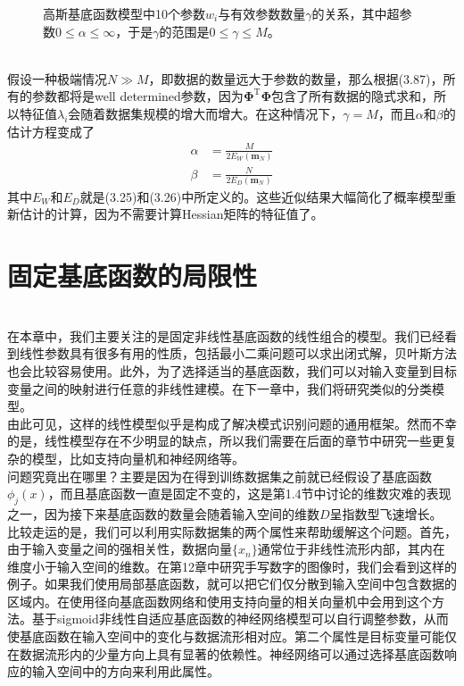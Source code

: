 \documentclass[b5paper]{book}
\numberwithin{equation}{chapter}
\newcommand {\rmT} {\mathrm{T}}
\newcommand {\bfPhi} {\boldsymbol{\Phi}}
\newcommand {\insertline} {\noindent{\color{red} \rule[5pt]{\textwidth}{0.1em}}}
\begin{document}
{\begin{figure}[ht]
		\caption{高斯基底函数模型中10个参数$w_i$与有效参数数量$\gamma$的关系，其中超参数$0 \leqslant \alpha \leqslant \infty$，于是$\gamma$的范围是$0 \leqslant \gamma \leq M$。}
		\label{fig:3-17}
	\end{figure}
	\\
	\indent 假设一种极端情况$N \gg M$，即数据的数量远大于参数的数量，那么根据(3.87)，所有的参数都将是well determined参数，因为$\bfPhi^{\rmT} \bfPhi$包含了所有数据的隐式求和，所以特征值$\lambda_i$会随着数据集规模的增大而增大。在这种情况下，$\gamma = M$，而且$\alpha$和$\beta$的估计方程变成了
	\begin{align}
		\alpha &= \frac{M}{2E_W(\mathbf{m}_N)} \\
		\beta &= \frac{N}{2E_D(\mathbf{m}_N)}
	\end{align}
	其中$E_W$和$E_D$就是(3.25)和(3.26)中所定义的。这些近似结果大幅简化了概率模型重新估计的计算，因为不需要计算Hessian矩阵的特征值了。
	}
	\section{固定基底函数的局限性}
	\insertline\\
	\textnormal{
	\indent 在本章中，我们主要关注的是固定非线性基底函数的线性组合的模型。我们已经看到线性参数具有很多有用的性质，包括最小二乘问题可以求出闭式解，贝叶斯方法也会比较容易使用。此外，为了选择适当的基底函数，我们可以对输入变量到目标变量之间的映射进行任意的非线性建模。在下一章中，我们将研究类似的分类模型。\\
	\indent 由此可见，这样的线性模型似乎是构成了解决模式识别问题的通用框架。然而不幸的是，线性模型存在不少明显的缺点，所以我们需要在后面的章节中研究一些更复杂的模型，比如支持向量机和神经网络等。\\
	\indent 问题究竟出在哪里？主要是因为在得到训练数据集之前就已经假设了基底函数$\phi_j(x)$，而且基底函数一直是固定不变的，这是第1.4节中讨论的维数灾难的表现之一，因为接下来基底函数的数量会随着输入空间的维数$D$呈指数型飞速增长。\\
	\indent 比较走运的是，我们可以利用实际数据集的两个属性来帮助缓解这个问题。首先，由于输入变量之间的强相关性，数据向量$\{x_n\}$通常位于非线性流形内部，其内在维度小于输入空间的维数。在第12章中研究手写数字的图像时，我们会看到这样的例子。如果我们使用局部基底函数，就可以把它们仅分散到输入空间中包含数据的区域内。在使用径向基底函数网络和使用支持向量的相关向量机中会用到这个方法。基于sigmoid非线性自适应基底函数的神经网络模型可以自行调整参数，从而使基底函数在输入空间中的变化与数据流形相对应。第二个属性是目标变量可能仅在数据流形内的少量方向上具有显著的依赖性。神经网络可以通过选择基底函数响应的输入空间中的方向来利用此属性。
	}
\end{document}
